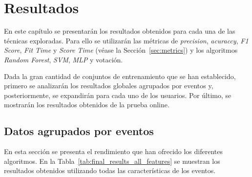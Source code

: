 \chapter{Resultados}
\label{chap:resultados}

En este capítulo se presentarán los resultados obtenidos para cada una de las técnicas exploradas. Para ello se utilizarán las métricas de \textit{precision}, \textit{acuraccy}, \textit{F1 Score}, \textit{Fit Time} y \textit{Score Time} (véase la Sección~\ref{sec:metrics}) y los algoritmos \textit{Random Forest}, \textit{SVM}, \textit{MLP} y votación.

Dada la gran cantidad de conjuntos de entrenamiento que se han establecido, primero se analizarán los resultados globales agrupados por eventos y, posteriormente, se expandirán para cada uno de los usuarios. Por último, se mostrarán los resultados obtenidos de la prueba online.


\section{Datos agrupados por eventos}
En esta sección se presenta el rendimiento que han ofrecido los diferentes algoritmos. En la Tabla~\ref{tab:final_results_all_features} se muestran los resultados obtenidos utilizando todas las características de los eventos.

